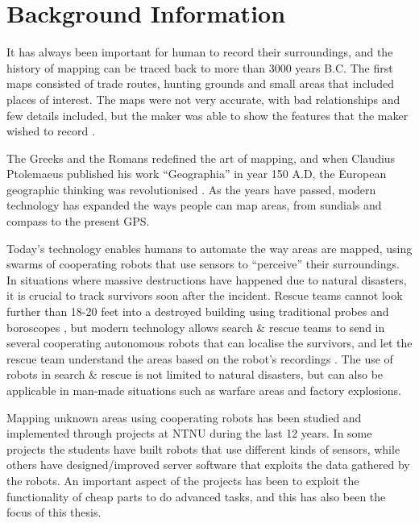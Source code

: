 \section{Background Information}
It has always been important for human to record their surroundings, and the history of mapping can be traced back to more than 3000 years B.C. The first maps consisted of trade routes, hunting grounds and small areas that included places of interest. The maps were not very accurate, with bad relationships and few details included, but the maker was able to show the features that the maker wished to record \cite{histmap}.

The Greeks and the Romans redefined the art of mapping, and when Claudius Ptolemaeus published his work ``Geographia'' in year 150 A.D, the European geographic thinking was revolutionised \cite{histmap}. As the years have passed, modern technology has expanded the ways people can map areas, from sundials and compass to the present GPS.

Today's technology enables humans to automate the way areas are mapped, using swarms of cooperating robots that use sensors to ``perceive'' their surroundings. In situations where massive destructions have happened due to natural disasters, it is crucial to track survivors soon after the incident. Rescue teams cannot look further than 18-20 feet into a destroyed building using traditional probes and boroscopes \cite{crasar}, but modern technology allows search \& rescue teams to send in several cooperating autonomous robots that can localise the survivors, and let the rescue team understand the areas based on the robot's recordings \cite{popsci}. The use of robots in search \& rescue is not limited to natural disasters, but can also be applicable in man-made situations such as warfare areas and factory explosions.

Mapping unknown areas using cooperating robots has been studied and implemented through projects at NTNU during the last 12 years. In some projects the students have built robots that use different kinds of sensors, while others have designed/improved server software that exploits the data gathered by the robots. An important aspect of the projects has been to exploit the functionality of cheap parts to do advanced tasks, and this has also been the focus of this thesis.
